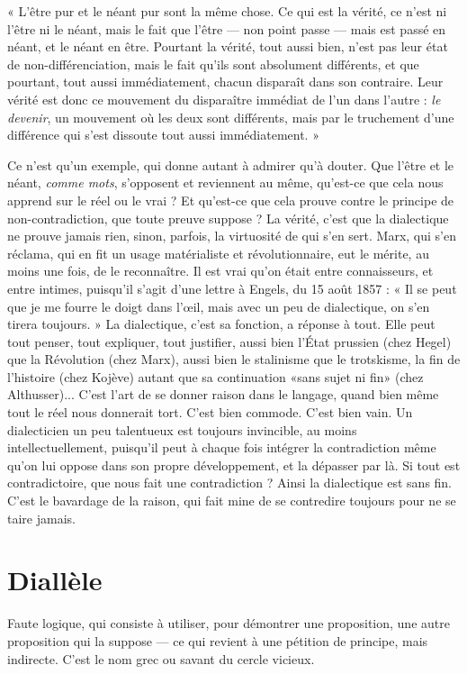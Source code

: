 \vspace{0.5cm}
{\footnotesize
« L’être pur et le néant pur sont la même chose. Ce qui est la vérité, ce n’est ni l'être
ni le néant, mais le fait que l'être — non point passe — mais est passé en néant, et le
néant en être. Pourtant la vérité, tout aussi bien, n’est pas leur état de non-différenciation,
mais le fait qu’ils sont absolument différents, et que pourtant, tout aussi immédiatement,
chacun disparaît dans son contraire. Leur vérité est donc ce mouvement du disparaître
immédiat de l’un dans l’autre : {\it le devenir}, un mouvement où les deux sont
différents, mais par le truchement d’une différence qui s’est dissoute tout aussi
immédiatement. »
}
\vspace{0.5cm}

Ce n’est qu’un exemple, qui donne autant à admirer qu’à douter. Que
l'être et le néant, {\it comme mots}, s'opposent et reviennent au même, qu'est-ce
que cela nous apprend sur le réel ou le vrai ? Et qu'est-ce que cela prouve
contre le principe de non-contradiction, que toute preuve suppose ? La
vérité, c’est que la dialectique ne prouve jamais rien, sinon, parfois, la virtuosité
de qui s’en sert. Marx, qui s’en réclama, qui en fit un usage matérialiste
et révolutionnaire, eut le mérite, au moins une fois, de le reconnaître. Il est
vrai qu'on était entre connaisseurs, et entre intimes, puisqu'il s’agit d’une
lettre à Engels, du 15 août 1857 : « Il se peut que je me fourre le doigt dans
l'œil, mais avec un peu de dialectique, on s’en tirera toujours. » La dialectique,
c’est sa fonction, a réponse à tout. Elle peut tout penser, tout expliquer,
tout justifier, aussi bien l’État prussien (chez Hegel) que la Révolution
(chez Marx), aussi bien le stalinisme que le trotskisme, la fin de l’histoire
(chez Kojève) autant que sa continuation «sans sujet ni fin» (chez
Althusser)... C’est l’art de se donner raison dans le langage, quand bien
même tout le réel nous donnerait tort. C’est bien commode. C’est bien vain.
Un dialecticien un peu talentueux est toujours invincible, au moins intellectuellement,
puisqu'il peut à chaque fois intégrer la contradiction même
qu’on lui oppose dans son propre développement, et la dépasser par là. Si
tout est contradictoire, que nous fait une contradiction ? Ainsi la dialectique
est sans fin. C’est le bavardage de la raison, qui fait mine de se contredire toujours
pour ne se taire jamais.

\section{Diallèle}
Faute logique, qui consiste à utiliser, pour démontrer une proposition,
une autre proposition qui la suppose — ce qui revient
à une pétition de principe, mais indirecte. C’est le nom grec ou savant du cercle
vicieux.

